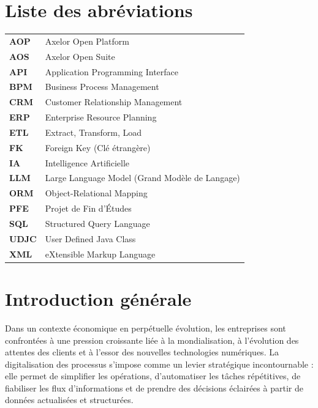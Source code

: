 \documentclass[a4paper,12pt]{article}
\begin{document}
\listoftables

\newpage
\section*{Liste des abréviations}

\begin{tabular}{p{} p{}}
\textbf{AOP}  & Axelor Open Platform \\[0.2cm]
\textbf{AOS}  & Axelor Open Suite \\[0.2cm]
\textbf{API}  & Application Programming Interface \\[0.2cm]
\textbf{BPM}  & Business Process Management \\[0.2cm]
\textbf{CRM}  & Customer Relationship Management \\[0.2cm]
\textbf{ERP}  & Enterprise Resource Planning \\[0.2cm]
\textbf{ETL}  & Extract, Transform, Load \\[0.2cm]
\textbf{FK}   & Foreign Key (Clé étrangère) \\[0.2cm]
\textbf{IA}   & Intelligence Artificielle \\[0.2cm]
\textbf{LLM}  & Large Language Model (Grand Modèle de Langage) \\[0.2cm]
\textbf{ORM}  & Object-Relational Mapping \\[0.2cm]
\textbf{PFE}  & Projet de Fin d'Études \\[0.2cm]
\textbf{SQL}  & Structured Query Language \\[0.2cm]
\textbf{UDJC} & User Defined Java Class \\[0.2cm]
\textbf{XML}  & eXtensible Markup Language \\[0.2cm]
\end{tabular}

\newpage
\section*{Introduction générale}

Dans un contexte économique en perpétuelle évolution, les entreprises sont confrontées à une pression croissante liée à la mondialisation, à l'évolution des attentes des clients et à l'essor des nouvelles technologies numériques. La digitalisation des processus s'impose comme un levier stratégique incontournable : elle permet de simplifier les opérations, d'automatiser les tâches répétitives, de fiabiliser les flux d'informations et de prendre des décisions éclairées à partir de données actualisées et structurées.
\end{document}
